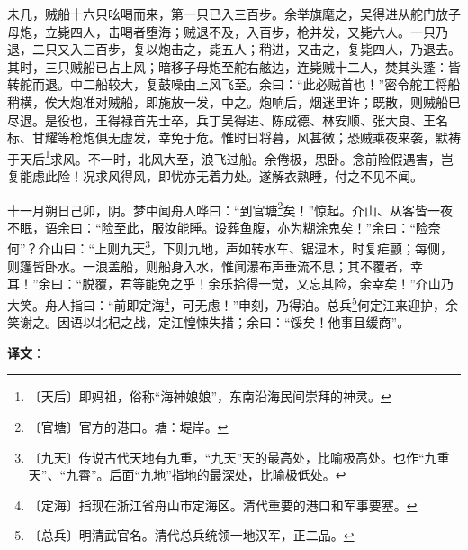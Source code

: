 \documentclass[12pt,UTF-8,openany]{ctexbook}
\begin{document}
\begin{normalsize}
    未几，贼船十六只吆喝而来，第一只已入三百步。余举旗麾之，吴得进从舵门放子母炮，立毙四人，击喝者堕海；贼退不及，入百步，枪并发，又毙六人。一只乃退，二只又入三百步，复以炮击之，毙五人；稍进，又击之，复毙四人，乃退去。其时，三只贼船已占上风；暗移子母炮至舵右舷边，连毙贼十二人，焚其头蓬：皆转舵而退。中二船较大，复鼓噪由上风飞至。余曰：“此必贼首也！”密令舵工将船稍横，俟大炮准对贼船，即施放一发，中之。炮响后，烟迷里许；既散，则贼船巳尽退。是役也，王得禄首先士卒，兵丁吴得进、陈成德、林安顺、张大良、王名标、甘耀等枪炮俱无虚发，幸免于危。惟时日将暮，风甚微；恐贼乘夜来袭，默祷于天后\footnote{〔天后〕即妈祖，俗称“海神娘娘”，东南沿海民间崇拜的神灵。}求风。不一时，北风大至，浪飞过船。余倦极，思卧。念前险假遇害，岂复能虑此险！况求风得风，即忧亦无着力处。遂解衣熟睡，付之不见不闻。
    
    十一月朔日己卯，阴。梦中闻舟人哗曰：“到官塘\footnote{〔官塘〕官方的港口。塘：堤岸。}矣！”惊起。介山、从客皆一夜不眠，语余曰：“险至此，服汝能睡。设葬鱼腹，亦为糊涂鬼矣！”余曰：“险奈何”？介山曰：“上则九天\footnote{〔九天〕传说古代天地有九重，“九天”天的最高处，比喻极高处。也作“九重天”、“九霄”。后面“九地”指地的最深处，比喻极低处。}，下则九地，声如转水车、锯湿木，时复疟颤；每侧，则篷皆卧水。一浪盖船，则船身入水，惟闻瀑布声垂流不息；其不覆者，幸耳！”余曰：“脱覆，君等能免之乎！余乐拾得一觉，又忘其险，余幸矣！”介山乃大笑。舟人指曰：“前即定海\footnote{〔定海〕指现在浙江省舟山市定海区。清代重要的港口和军事要塞。}，可无虑！”申刻，乃得泊。总兵\footnote{〔总兵〕明清武官名。清代总兵统领一地汉军，正二品。}何定江来迎护，余笑谢之。因语以北杞之战，定江惶悚失措；余曰：“馁矣！他事且缓商”。
\end{normalsize}


\newpage

\textbf{译文}：

\vspace{1em}
\end{document}
